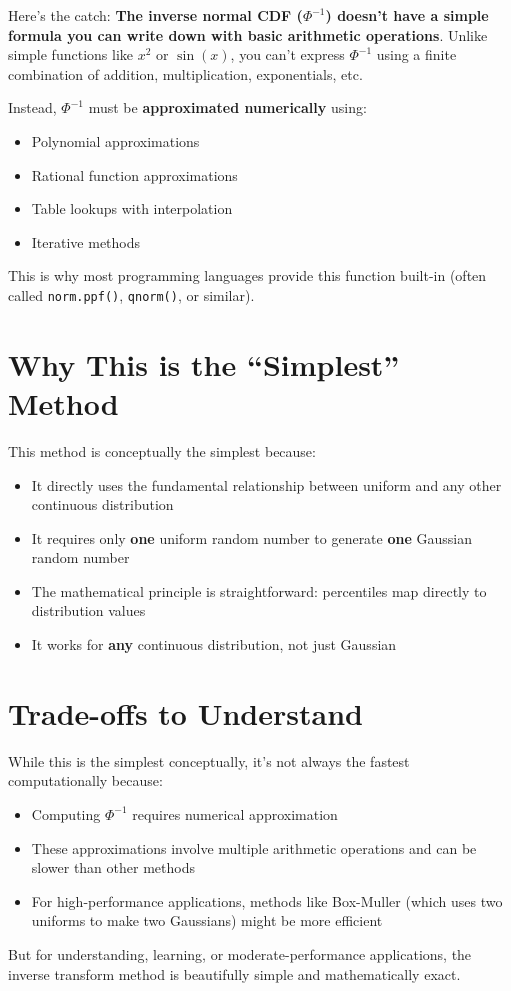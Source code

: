 \documentclass[12pt]{article}
\begin{document}
Here's the catch: \textbf{The inverse normal CDF ($\Phi^{-1}$) doesn't have a simple formula you can write down with basic arithmetic operations}. Unlike simple functions like $x^2$ or $\sin(x)$, you can't express $\Phi^{-1}$ using a finite combination of addition, multiplication, exponentials, etc.

Instead, $\Phi^{-1}$ must be \textbf{approximated numerically} using:

\begin{itemize}
\item Polynomial approximations
    \item Rational function approximations  
    \item Table lookups with interpolation
    \item Iterative methods
\end{itemize}

This is why most programming languages provide this function built-in (often called \texttt{norm.ppf()}, \texttt{qnorm()}, or similar).

\section*{Why This is the ``Simplest'' Method}

This method is conceptually the simplest because:
\begin{itemize}
\item It directly uses the fundamental relationship between uniform and any other continuous distribution
    \item It requires only \textbf{one} uniform random number to generate \textbf{one} Gaussian random number
    \item The mathematical principle is straightforward: percentiles map directly to distribution values
    \item It works for \textbf{any} continuous distribution, not just Gaussian
\end{itemize}

\section*{Trade-offs to Understand}

While this is the simplest conceptually, it's not always the fastest computationally because:
\begin{itemize}
\item Computing $\Phi^{-1}$ requires numerical approximation
    \item These approximations involve multiple arithmetic operations and can be slower than other methods
    \item For high-performance applications, methods like Box-Muller (which uses two uniforms to make two Gaussians) might be more efficient
\end{itemize}
But for understanding, learning, or moderate-performance applications, the inverse transform method is beautifully simple and mathematically exact.
\end{document}
